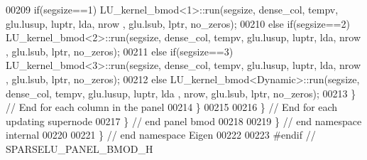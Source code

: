 \begin{DoxyCode}
00209               \textcolor{keywordflow}{if}(segsize==1)  LU\_kernel\_bmod<1>::run(segsize, dense\_col, tempv, glu.lusup, luptr, lda, nrow
      , glu.lsub, lptr, no\_zeros);
00210         \textcolor{keywordflow}{else}  \textcolor{keywordflow}{if}(segsize==2)  LU\_kernel\_bmod<2>::run(segsize, dense\_col, tempv, glu.lusup, luptr, lda, nrow
      , glu.lsub, lptr, no\_zeros);
00211         \textcolor{keywordflow}{else}  \textcolor{keywordflow}{if}(segsize==3)  LU\_kernel\_bmod<3>::run(segsize, dense\_col, tempv, glu.lusup, luptr, lda, nrow
      , glu.lsub, lptr, no\_zeros);
00212         \textcolor{keywordflow}{else}                  LU\_kernel\_bmod<Dynamic>::run(segsize, dense\_col, tempv, glu.lusup, luptr, lda
      , nrow, glu.lsub, lptr, no\_zeros); 
00213       \} \textcolor{comment}{// End for each column in the panel }
00214     \}
00215     
00216   \} \textcolor{comment}{// End for each updating supernode}
00217 \} \textcolor{comment}{// end panel bmod}
00218 
00219 \} \textcolor{comment}{// end namespace internal}
00220 
00221 \} \textcolor{comment}{// end namespace Eigen}
00222 
00223 \textcolor{preprocessor}{#endif // SPARSELU\_PANEL\_BMOD\_H}
\end{DoxyCode}
